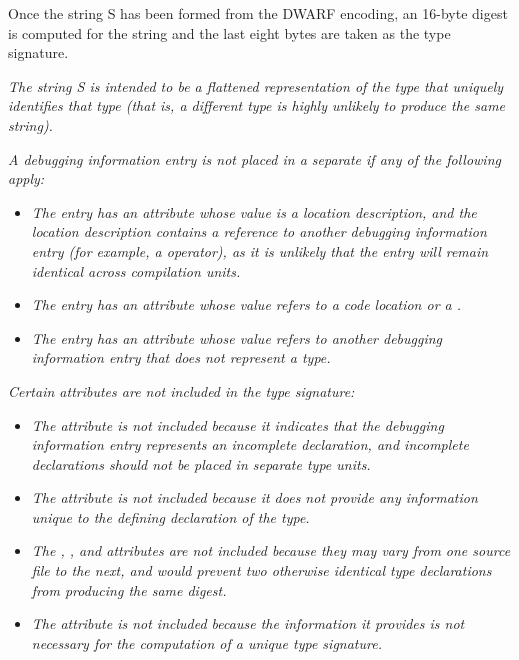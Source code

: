Once the string S has been formed from the DWARF encoding,
an 16-byte \MDfive{} digest is computed for the string and the 
last eight bytes are taken as the type signature.

\textit{The string S is intended to be a flattened representation of
the type that uniquely identifies that type (that is, a different
type is highly unlikely to produce the same string).}

\textit{A debugging information entry is not 
\db
placed in a
separate  if any of the following apply:}

\begin{itemize}

\item \textit{The entry has an attribute whose value is a location
description, and the location description 
contains a reference to
another debugging information entry (for example, a \DWOPcallref{}
operator), as it is unlikely that the entry will remain
identical across compilation units.}

\item \textit{The entry has an attribute whose value refers
to a code location or a .}

\item \textit{The entry has an attribute whose value refers
to another debugging information entry that does not represent
a type.}
\end{itemize}


\textit{Certain attributes are not included in the type signature:}

\begin{itemize}
\item \textit{The \DWATdeclaration{} attribute is not included because it
indicates that the debugging information entry represents an
incomplete declaration, and incomplete declarations should
not be placed in 
separate type units.}

\item \textit{The \DWATdescription{} attribute is not included because
it does not provide any information unique to the defining
declaration of the type.}

\item \textit{The \DWATdeclfile, 
\DWATdeclline, and
\DWATdeclcolumn{} attributes are not included because they
may vary from one source file to the next, and would prevent
two otherwise identical type declarations from producing the
same \MDfive{} digest.}

\item \textit{The \DWATobjectpointer{} attribute is not included 
because the information it provides is not necessary for the 
computation of a unique type signature.}

\end{itemize}

